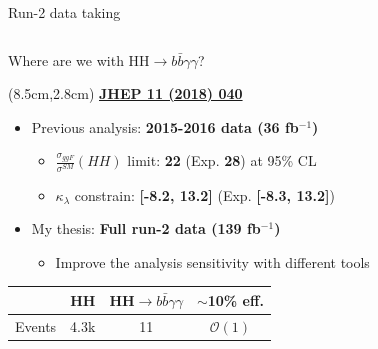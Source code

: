 \begin{frame}{Run-2 data taking}
\begin{columns}

\end{columns}  
\end{frame}

\begin{frame}{Where are we with HH$\to b\bar{b}\gamma\gamma$?}
 
\begin{textblock*}{5cm}(8.5cm,2.8cm) %
   \textcolor{applegreen}{\textbf{\href{https://link.springer.com/article/10.1007\%2FJHEP11\%282018\%29040}{JHEP 11 (2018) 040}}}
\end{textblock*}

\begin{itemize}
    \item Previous analysis: \textbf{\textcolor{applegreen}{2015-2016 data (36 fb$^{-1}$)}}
    \begin{itemize}
        \item $\frac{\sigma_{ggF}}{\sigma^{SM}}(HH)$ limit: \textbf{\textcolor{structurColor}{22}} (Exp. \textbf{28}) at 95\% CL
        \item $\kappa_{\lambda}$ constrain: \textbf{\textcolor{structurColor}{[-8.2, 13.2]}} (Exp. \textbf{[-8.3, 13.2]})
    \end{itemize}
\pause    
    \item My thesis: \textbf{\textcolor{HHred}{Full run-2 data (139 fb$^{-1}$)}}
    \begin{itemize}
        \item Improve the analysis sensitivity with different tools
    \end{itemize}
\end{itemize}    
\vspace{1em}
\begin{tabular}{lccc}
    \hline 
    \hline
     & HH & HH$\to b\bar{b}\gamma\gamma$ & $\sim$10\% eff. \\
     \hline
    Events  & 4.3k & 11 & $\mathcal{O}(1)$ \\
      \hline\hline 
\end{tabular}    
\end{frame}